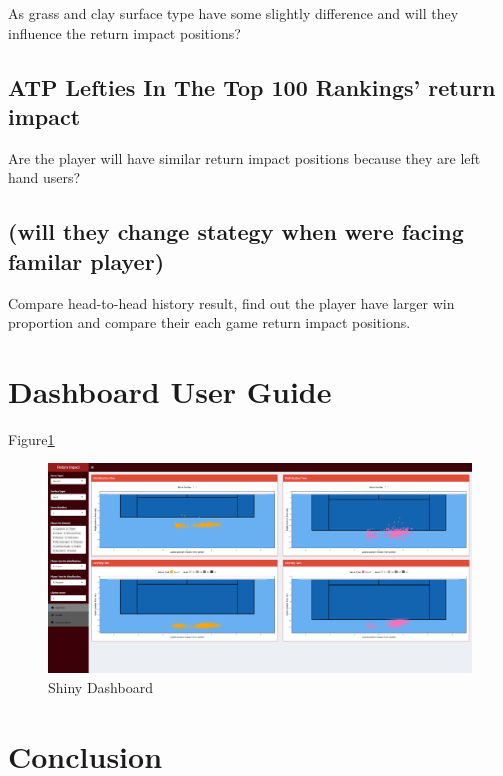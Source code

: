 \documentclass[11pt,a4paper,]{article}
\begin{document}
As grass and clay surface type have some slightly difference and will they influence the return impact positions?

\hypertarget{atp-lefties-in-the-top-100-rankings-return-impact}{%
\subsection{ATP Lefties In The Top 100 Rankings' return impact}\label{atp-lefties-in-the-top-100-rankings-return-impact}}

Are the player will have similar return impact positions because they are left hand users?

\hypertarget{will-they-change-stategy-when-were-facing-familar-player}{%
\subsection{(will they change stategy when were facing familar player)}\label{will-they-change-stategy-when-were-facing-familar-player}}

Compare head-to-head history result, find out the player have larger win proportion and compare their each game return impact positions.

\hypertarget{dashboard-user-guide}{%
\section{Dashboard User Guide}\label{dashboard-user-guide}}

Figure\ref{fig:dashboard}

\begin{figure}
\includegraphics[width=1\linewidth]{image/dashboard} \caption{Shiny Dashboard}\label{fig:dashboard}
\end{figure}

\hypertarget{conclusion}{%
\section{Conclusion}\label{conclusion}}

\printbibliography[title=Reference]
\end{document}
